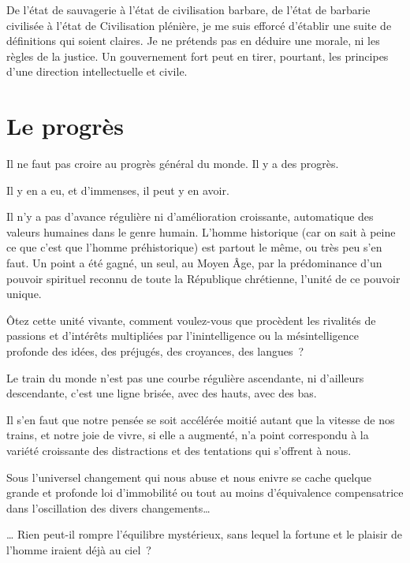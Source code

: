 \documentclass[french,twoside]{book} %
\newcommand{\astermono}{\medskip\centerline{\color{rubric}\large\selectfont{\syms ✻}}\medskip\par}%
\begin{document}
\noindent De l’état de sauvagerie à l’état de civilisation barbare, de l’état de barbarie civilisée à l’état de Civilisation plénière, je me suis efforcé d’établir une suite de définitions qui soient claires. Je ne prétends pas en déduire une morale, ni les règles de la justice. Un gouvernement fort peut en tirer, pourtant, les principes d’une direction intellectuelle et civile.
\section[{Le progrès}]{Le progrès}
\noindent Il ne faut pas croire au progrès général du monde. Il y a des progrès.\par
Il y en a eu, et d’immenses, il peut y en avoir.\par
Il n’y a pas d’avance régulière ni d’amélioration croissante, automatique des valeurs humaines dans le genre humain. L’homme historique (car on sait à peine ce que c’est que l’homme préhistorique) est partout le même, ou très peu s’en faut. Un point a été gagné, un seul, au Moyen Âge, par la prédominance d’un pouvoir spirituel reconnu de toute la République chrétienne, l’unité de ce pouvoir unique.\par
Ôtez cette unité vivante, comment voulez-vous que procèdent les rivalités de passions et d’intérêts multipliées par l’inintelligence ou la mésintelligence profonde des idées, des préjugés, des croyances, des langues ?\par
Le train du monde n’est pas une courbe régulière ascendante, ni d’ailleurs descendante, c’est une ligne brisée, avec des hauts, avec des bas.\par

\astermono

\noindent Il s’en faut que notre pensée se soit accélérée moitié autant que la vitesse de nos trains, et notre joie de vivre, si elle a augmenté, n’a point correspondu à la variété croissante des distractions et des tentations qui s’offrent à nous.\par
Sous l’universel changement qui nous abuse et nous enivre se cache quelque grande et profonde loi d’immobilité ou tout au moins d’équivalence compensatrice dans l’oscillation des divers changements…\par
… Rien peut-il rompre l’équilibre mystérieux, sans lequel la fortune et le plaisir de l’homme iraient déjà au ciel ?\par

\astermono
\end{document}
